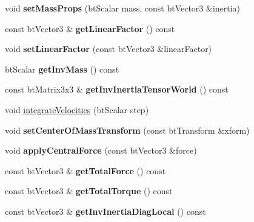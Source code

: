 \begin{DoxyCompactItemize}
\item 
\mbox{\label{classbtRigidBody_a912b4a273bcd6fe9af25c47106db900c}} 
void {\bfseries set\+Mass\+Props} (bt\+Scalar mass, const bt\+Vector3 \&inertia)
\item 
\mbox{\label{classbtRigidBody_a39ea489339ebdc7c4e005e6b0b43fcca}} 
const bt\+Vector3 \& {\bfseries get\+Linear\+Factor} () const
\item 
\mbox{\label{classbtRigidBody_a00cf3fa28987ffb77764e5bd3605e3ef}} 
void {\bfseries set\+Linear\+Factor} (const bt\+Vector3 \&linear\+Factor)
\item 
\mbox{\label{classbtRigidBody_a4c67acaeab4799ffda7a0d8a63df7ae6}} 
bt\+Scalar {\bfseries get\+Inv\+Mass} () const
\item 
\mbox{\label{classbtRigidBody_ab328d8f35b8c62a4ee0dc5f111b81b37}} 
const bt\+Matrix3x3 \& {\bfseries get\+Inv\+Inertia\+Tensor\+World} () const
\item 
void \hyperlink{classbtRigidBody_a16029bc5aabcbb33aaf7e6e6e819283a}{integrate\+Velocities} (bt\+Scalar step)
\item 
\mbox{\label{classbtRigidBody_adeaff2386513eeaaa138e0e3b3acca66}} 
void {\bfseries set\+Center\+Of\+Mass\+Transform} (const bt\+Transform \&xform)
\item 
\mbox{\label{classbtRigidBody_a48478896407083f4ff64299e0c3c4a32}} 
void {\bfseries apply\+Central\+Force} (const bt\+Vector3 \&force)
\item 
\mbox{\label{classbtRigidBody_aaeba73314c3a932d2a3f7b198eabf97c}} 
const bt\+Vector3 \& {\bfseries get\+Total\+Force} () const
\item 
\mbox{\label{classbtRigidBody_a6587c6d8add7e07c5cbb620303cecb5e}} 
const bt\+Vector3 \& {\bfseries get\+Total\+Torque} () const
\item 
\mbox{\label{classbtRigidBody_ae9099e39ca4e591acf1d28ec95a038b9}} 
const bt\+Vector3 \& {\bfseries get\+Inv\+Inertia\+Diag\+Local} () const

\end{DoxyCompactItemize}
